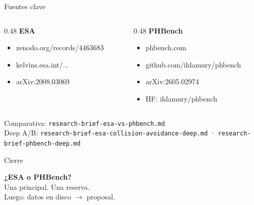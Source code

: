 \documentclass[aspectratio=169,10pt]{beamer}
\begin{document}
\begin{frame}{Fuentes clave}
  \begin{columns}[T]
    \begin{column}{0.48\textwidth}
      \textbf{ESA}
      \begin{itemize}
        \item zenodo.org/records/4463683
        \item kelvins.esa.int/...
        \item arXiv:2008.03069
      \end{itemize}
    \end{column}
    \begin{column}{0.48\textwidth}
      \textbf{PHBench}
      \begin{itemize}
        \item phbench.com
        \item github.com/ihlamury/phbench
        \item arXiv:2605.02974
        \item HF: ihlamury/phbench
      \end{itemize}
    \end{column}
  \end{columns}
  \vspace{0.35em}
  {\scriptsize
  Comparativa: \texttt{research-brief-esa-vs-phbench.md}\\
  Deep A/B: \texttt{research-brief-esa-collision-avoidance-deep.md} · \texttt{research-brief-phbench-deep.md}}
\end{frame}

\begin{frame}{Cierre}
  \begin{center}
    {\Large\textbf{¿ESA o PHBench?}}\\[0.6em]
    Una principal. Una reserva.\\[0.4em]
    Luego: datos en disco $\rightarrow$ proposal.
  \end{center}
\end{frame}
\end{document}
